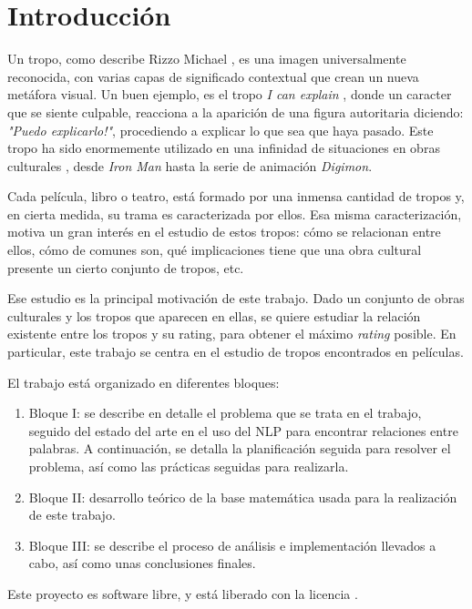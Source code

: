 \chapter{Introducción}

Un tropo, como describe Rizzo Michael \cite{rizzo2013art}, es una imagen
universalmente reconocida, con varias capas de significado contextual que
crean un nueva metáfora visual. Un buen ejemplo, es el tropo \emph{I can
    explain} \cite{tropo:ICanExplain}, donde un caracter que se siente culpable,
reacciona a la aparición de una figura autoritaria diciendo: \emph{"Puedo
    explicarlo!"}, procediendo a explicar lo que sea que haya pasado. Este tropo ha
sido enormemente utilizado en una infinidad de situaciones en obras culturales
\cite{tropo:ICanExplain}, desde \emph{Iron Man} hasta la serie de animación
\emph{Digimon}.

Cada película, libro o teatro, está formado por una inmensa cantidad de tropos
y, en cierta medida, su trama es caracterizada por ellos. Esa misma
caracterización, motiva un gran interés en el estudio de estos tropos: cómo se
relacionan entre ellos, cómo de comunes son, qué implicaciones tiene que una
obra cultural presente un cierto conjunto de tropos, etc.

Ese estudio es la principal motivación de este trabajo. Dado un conjunto de
obras culturales y los tropos que aparecen en ellas, se quiere estudiar la
relación existente entre los tropos y su rating, para obtener el máximo \emph
{rating} posible. En particular, este trabajo se centra en el estudio de tropos
encontrados en películas.


El trabajo está organizado en diferentes bloques:

\begin{enumerate}
    \item Bloque I: se describe en detalle el problema que se trata en el
          trabajo, seguido del estado del arte en el uso del NLP para encontrar
          relaciones entre palabras. A continuación, se detalla la planificación
          seguida para resolver el problema, así como las prácticas seguidas para
          realizarla.
    \item Bloque II: desarrollo teórico de la base matemática usada para la
          realización de este trabajo.
    \item Bloque III: se describe el proceso de análisis e implementación
          llevados a cabo, así como unas conclusiones finales.
\end{enumerate}

Este proyecto es software libre, y está liberado con la licencia \cite{gplv3}.